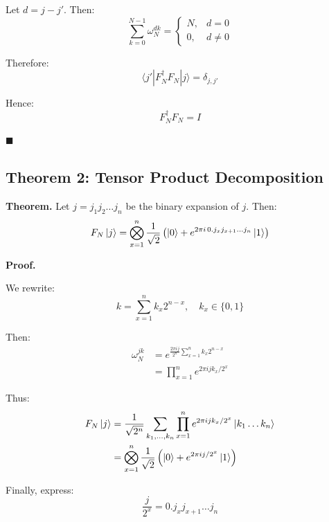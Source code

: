 \documentclass[conference]{article}
\begin{document}
Let $d = j - j'$. Then:
\begin{equation}
\sum_{k=0}^{N-1} \omega_N^{dk}
=
\begin{cases}
N, & d = 0 \\
0, & d \neq 0
\end{cases}
\end{equation}

Therefore:
\begin{equation}
\langle j' | F_N^\dagger F_N | j \rangle = \delta_{j,j'}
\end{equation}

Hence:
\begin{equation}
F_N^\dagger F_N = I
\end{equation}

\hfill $\blacksquare$

\subsection{Theorem 2: Tensor Product Decomposition}

\textbf{Theorem.}
Let $j = j_1 j_2 \dots j_n$ be the binary expansion of $j$. Then:
\begin{equation}
F_N \ket{j}
=
\bigotimes_{x=1}^{n}
\frac{1}{\sqrt{2}}
\left(
\ket{0} + e^{2\pi i \, 0.j_x j_{x+1}\dots j_n} \ket{1}
\right)
\end{equation}

\textbf{Proof.}

We rewrite:
\begin{equation}
k = \sum_{x=1}^{n} k_x 2^{n-x}, \quad k_x \in \{0,1\}
\end{equation}

Then:
\begin{align}
\omega_N^{jk}
&= e^{\frac{2\pi i j}{2^n} \sum_{x=1}^{n} k_x 2^{n-x}} \\
&= \prod_{x=1}^{n} e^{2\pi i j k_x / 2^x}
\end{align}

Thus:
\begin{align}
F_N \ket{j}
&= \frac{1}{\sqrt{2^n}} \sum_{k_1,\dots,k_n}
\prod_{x=1}^{n} e^{2\pi i j k_x / 2^x}
\ket{k_1 \dots k_n} \\
&= \bigotimes_{x=1}^{n}
\frac{1}{\sqrt{2}}
\left(
\ket{0} + e^{2\pi i j / 2^x} \ket{1}
\right)
\end{align}

Finally, express:
\begin{equation}
\frac{j}{2^x} = 0.j_x j_{x+1} \dots j_n
\end{equation}
\end{document}
